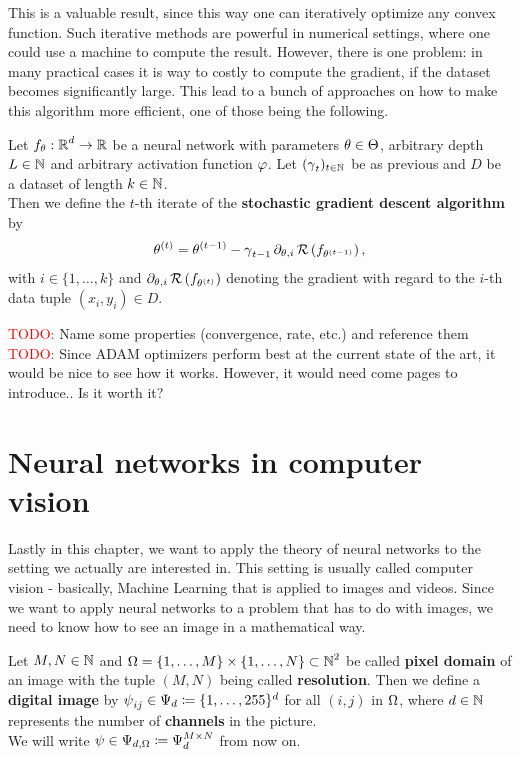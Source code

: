 This is a valuable result, since this way one can iteratively optimize any convex function. Such iterative methods are powerful in numerical settings, where one could use a machine to compute the result. However, there is one problem: in many practical cases it is way to costly to compute the gradient, if the dataset becomes significantly large. This lead to a bunch of approaches on how to make this algorithm more efficient, one of those being the following.

\begin{theorem}
Let $f_\theta:\operatorname{\mathbb{R}}^d\to \operatorname{\mathbb{R}}$ be a neural network with parameters $\theta\in\operatorname{\Theta}$, arbitrary depth $L\in\operatorname{\mathbb{N}}$ and arbitrary activation function $\operatorname{\varphi}$. Let $(\operatorname{\gamma}_t)_{t \in \operatorname{\mathbb{N}}}$ be as previous and $D$ be a dataset of length $k\in \operatorname{\mathbb{N}}$.\\
Then we define the $t$-th iterate of the \textbf{stochastic gradient descent algorithm} by
\begin{align}
\theta^{(t)} = \theta^{(t - 1)} - \operatorname{\gamma}_{t-1} \partial_{\theta, i} \operatorname{\mathcal{R}} \left(f_{\theta^{(t - 1)}}\right),
\end{align}
with $i \in \{1,\ldots, k\}$ and $\partial_{\theta, i} \operatorname{\mathcal{R}} \left(f_{\theta^{(t)}}\right)$ denoting the gradient with regard to the $i$-th data tuple $(x_i, y_i) \in D$.
\end{theorem}


\textcolor{red}{TODO:} Name some properties (convergence, rate, etc.) and reference them \\
\textcolor{red}{TODO:} Since ADAM optimizers perform best at the current state of the art, it would be nice to see how it works. However, it would need come pages to introduce.. Is it worth it?

\section{Neural networks in computer vision}

Lastly in this chapter, we want to apply the theory of neural networks to the setting we actually are interested in. This setting is usually called computer vision - basically, Machine Learning that is applied to images and videos. Since we want to apply neural networks to a problem that has to do with images, we need to know how to see an image in a mathematical way.

\begin{definition}\label{def_picture}
Let $M,N\in\operatorname{\mathbb{N}}$ and $\Omega=\{1,\ldots,M\}\times \{1,\ldots,N\} \subset \operatorname{\mathbb{N}}^2$ be called \textbf{pixel domain} of an image with the tuple $(M,N)$ being called \textbf{resolution}. Then we define a \textbf{digital image} by $\operatorname{\psi}_{ij} \in \Psi_d \coloneqq \{1,\ldots,255\}^d$ for all $(i,j)$ in $\Omega$, where $d\in\operatorname{\mathbb{N}}$ represents the number of \textbf{channels} in the picture.\\
We will write $\operatorname{\psi}\in\Psi_{d,\Omega}\coloneqq \Psi_d^{M\times N}$ from now on.
\end{definition}

